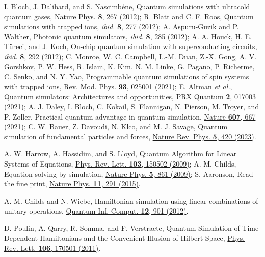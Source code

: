 \documentclass[aps,pra,twocolumn,floatfix,groupedaddress,superscriptaddress,nofootinbib,notitlepage]{revtex4-2}
\begin{document}
\begin{thebibliography}{100}
 I. Bloch, J. Dalibard, and S. Nascimb\'{e}ne, Quantum simulations with ultracold quantum gases, \href{https://doi.org/10.1038/nphys2259}{Nature Phys. \textbf{8}, 267 (2012)}; R. Blatt and C. F. Roos, Quantum simulations with trapped ions, \href{https://doi.org/10.1038/nphys2252}{\textit{ibid.} \textbf{8}, 277 (2012)}; A. Aspuru-Guzik and P. Walther, Photonic quantum simulators, \href{https://doi.org/10.1038/nphys2253}{\textit{ibid.} \textbf{8}, 285 (2012)}; A. A. Houck, H. E. T\"{u}reci, and J. Koch, On-chip quantum simulation with superconducting circuits, \href{https://doi.org/10.1038/nphys2251}{\textit{ibid.} \textbf{8}, 292 (2012)}; C. Monroe, W. C. Campbell, L.-M. Duan, Z.-X. Gong, A. V. Gorshkov, P. W. Hess, R. Islam, K. Kim, N. M. Linke, G. Pagano, P. Richerme, C. Senko, and N. Y. Yao, Programmable quantum simulations of spin systems with trapped ions, \href{https://doi.org/10.1103/RevModPhys.93.025001}{Rev. Mod. Phys. \textbf{93}, 025001 (2021)}; E. Altman \textit{et al.}, Quantum simulators: Architectures and opportunities, \href{https://doi.org/10.1103/PRXQuantum.2.017003}{PRX Quantum \textbf{2}, 017003 (2021)}; A. J. Daley, I. Bloch, C. Kokail, S. Flannigan, N. Pierson, M. Troyer, and P. Zoller, Practical quantum advantage in quantum simulation, \href{https://doi.org/10.1038/s41586-022-04940-6}{Nature \textbf{607}, 667 (2021)}; C. W. Bauer, Z. Davoudi, N. Klco, and M. J. Savage, Quantum simulation of fundamental particles and forces, \href{https://doi.org/10.1038/s42254-023-00599-8}{Nature Rev. Phys. \textbf{5}, 420 (2023)}.

 A. W. Harrow, A. Hassidim, and S. Lloyd, Quantum Algorithm for Linear Systems of Equations, \href{https://doi.org/10.1103/PhysRevLett.103.150502}{Phys. Rev. Lett. \textbf{103}, 150502 (2009)}; A. M. Childs, Equation solving by simulation, \href{https://doi.org/10.1038/nphys1473}{Nature Phys. \textbf{5}, 861 (2009)}; S. Aaronson, Read the fine print, \href{https://doi.org/10.1038/nphys3272}{Nature Phys. \textbf{11}, 291 (2015)}.

 A. M. Childs and N. Wiebe, Hamiltonian simulation using linear combinations of unitary operations, \href{https://doi.org/10.26421/QIC12.11-12}{Quantum Inf. Comput. \textbf{12}, 901 (2012)}. 

 D. Poulin, A. Qarry, R. Somma, and F. Verstraete, Quantum Simulation of Time-Dependent Hamiltonians and the Convenient Illusion of Hilbert Space, \href{https://doi.org/10.1103/PhysRevLett.106.170501}{Phys. Rev. Lett. \textbf{106}, 170501 (2011)}.


\end{thebibliography}
\end{document}
